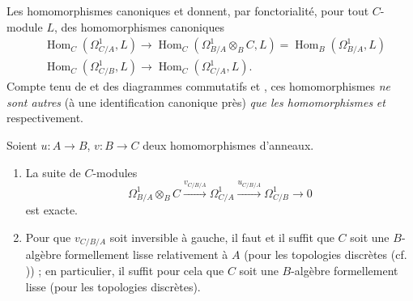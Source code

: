 \begin{env}[20.5.6]
\label{0.20.5.6-fr}
Les homomorphismes canoniques  et
 donnent, par fonctorialité, pour tout $C$-module $L$,
des homomorphismes canoniques
\begin{align}
\tag{20.5.6.1}
\label{0.20.5.6.1-fr}
  &\operatorname{Hom}_C(\Omega^1_{C/A},L)
  \to\operatorname{Hom}_C(\Omega^1_{B/A}\otimes_B C,L)
  =\operatorname{Hom}_B(\Omega^1_{B/A},L) \\
\tag{20.5.6.2}
\label{0.20.5.6.2-fr}
  &\operatorname{Hom}_C(\Omega^1_{C/B},L)
  \to\operatorname{Hom}_C(\Omega^1_{C/A},L).
\end{align}
Compte tenu de  et des diagrammes commutatifs
 et , ces homomorphismes \emph{ne sont
autres} (à une identification canonique près) \emph{que les homomorphismes}
 \emph{et}  respectivement.
\end{env}

\begin{theorem}[20.5.7]
\label{0.20.5.7-fr}
Soient $u:A\to B$, $v:B\to C$ deux homomorphismes d'anneaux.
\begin{enumerate}
  \item[\rm(i)] La suite de $C$-modules
\begin{equation}
\tag{20.5.7.1}
\label{0.20.5.7.1-fr}
  \Omega^1_{B/A}\otimes_B C
  \xrightarrow{v_{C/B/A}}\Omega^1_{C/A}
  \xrightarrow{u_{C/B/A}}\Omega^1_{C/B}\to0
\end{equation}
est exacte.
  \item[\rm(ii)] Pour que $v_{C/B/A}$ soit inversible à gauche, il faut et
  il suffit que $C$ soit une $B$-algèbre formellement lisse relativement à
  $A$ (pour les topologies discrètes \textup{(cf. )}) ; en
  particulier, il suffit pour cela que $C$ soit une $B$-algèbre formellement
  lisse (pour les topologies discrètes).
\end{enumerate}
\end{theorem}

